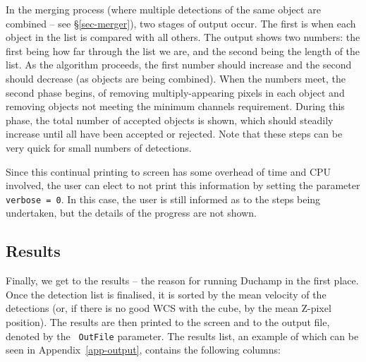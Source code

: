 \documentclass[12pt,a4paper]{article}
\begin{document}
In the merging process (where multiple detections of the same object
are combined -- see \S\ref{sec-merger}), two stages of output
occur. The first is when each object in the list is compared with all
others. The output shows two numbers: the first being how far through
the list we are, and the second being the length of the list. As the
algorithm proceeds, the first number should increase and the second
should decrease (as objects are being combined). When the numbers
meet, the second phase begins, of removing multiply-appearing pixels
in each object and removing objects not meeting the minimum channels
requirement. During this phase, the total number of accepted objects
is shown, which should steadily increase until all have been accepted
or rejected. Note that these steps can be very quick for small numbers
of detections.

Since this continual printing to screen has some overhead of time and
CPU involved, the user can elect to not print this information by
setting the parameter {\tt verbose = 0}. In this case, the user is
still informed as to the steps being undertaken, but the details of
the progress are not shown.

\subsection{Results}

Finally, we get to the results -- the reason for running Duchamp in
the first place. Once the detection list is finalised, it is sorted by
the mean velocity of the detections (or, if there is no good WCS with
the cube, by the mean Z-pixel position). The results are then
printed to the screen and to the output file, denoted by the {\tt
OutFile} parameter. The results list, an example of which can be seen
in Appendix~\ref{app-output}, contains the following columns:
\end{document}
